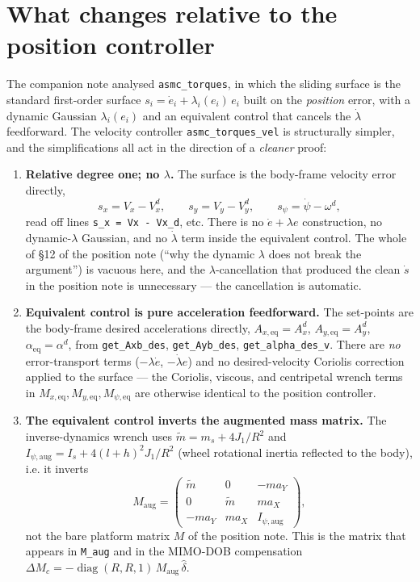 \documentclass[11pt]{article}
\theoremstyle{plain}
\theoremstyle{definition}
\newcommand{\Vx}{V_x}
\newcommand{\Vy}{V_y}
\newcommand{\Maug}{M_{\mathrm{aug}}}
\begin{document}
\tableofcontents

\section{What changes relative to the position controller}
\label{sec:changes}

The companion note analysed \texttt{asmc\_torques}, in which the sliding surface is
the standard first-order surface $s_i=\dot e_i+\lambda_i(e_i)\,e_i$ built on the
\emph{position} error, with a dynamic Gaussian $\lambda_i(e_i)$ and an
equivalent control that cancels the $\dot\lambda$ feedforward. The velocity
controller \texttt{asmc\_torques\_vel} is structurally simpler, and the
simplifications all act in the direction of a \emph{cleaner} proof:

\begin{enumerate}[leftmargin=2em]
\item \textbf{Relative degree one; no $\lambda$.} The surface is the body-frame
velocity error directly,
\begin{equation}
s_x=\Vx-\Vx^{d}, \qquad s_y=\Vy-\Vy^{d}, \qquad s_\psi=\dot\psi-\omega^{d},
\label{eq:surface}
\end{equation}
read off lines \texttt{s\_x = Vx - Vx\_d}, etc. There is no $\dot e+\lambda e$
construction, no dynamic-$\lambda$ Gaussian, and no $\dot\lambda$ term inside the
equivalent control. The whole of \S12 of the position note (``why the dynamic
$\lambda$ does not break the argument'') is vacuous here, and the
$\lambda$-cancellation that produced the clean $\dot s$ in the position note is
unnecessary --- the cancellation is automatic.

\item \textbf{Equivalent control is pure acceleration feedforward.} The set-points are
the body-frame desired accelerations directly,
$A_{x,\mathrm{eq}}=A_x^{d}$, $A_{y,\mathrm{eq}}=A_y^{d}$,
$\alpha_{\mathrm{eq}}=\alpha^{d}$, from \texttt{get\_Axb\_des}, \texttt{get\_Ayb\_des},
\texttt{get\_alpha\_des\_v}. There are \emph{no} error-transport terms
($-\lambda\dot e$, $-\dot\lambda e$) and no desired-velocity Coriolis correction
applied to the surface --- the Coriolis, viscous, and centripetal wrench terms in
$M_{x,\mathrm{eq}},M_{y,\mathrm{eq}},M_{\psi,\mathrm{eq}}$ are otherwise identical
to the position controller.

\item \textbf{The equivalent control inverts the augmented mass matrix.} The
inverse-dynamics wrench uses $\tilde m=m_s+4J_1/R^2$ and
$I_{\psi,\mathrm{aug}}=I_s+4(l+h)^2 J_1/R^2$ (wheel rotational inertia reflected to
the body), i.e. it inverts
\begin{equation}
\Maug=\begin{pmatrix}
\tilde m & 0 & -m a_Y\\
0 & \tilde m & m a_X\\
-m a_Y & m a_X & I_{\psi,\mathrm{aug}}
\end{pmatrix},
\label{eq:Maug}
\end{equation}
not the bare platform matrix $M$ of the position note. This is the matrix that
appears in \texttt{M\_aug} and in the MIMO-DOB compensation
$\Delta M_c=-\operatorname{diag}(R,R,1)\,\Maug\,\hat\delta$.


\end{enumerate}
\end{document}
